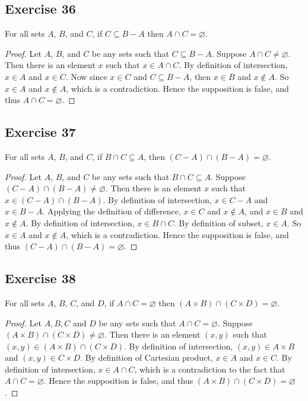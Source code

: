 \documentclass[14pt]{extarticle}
\newcommand{\es}{\varnothing}
\begin{document}
\subsection{Exercise 36}
For all sets $A$, $B$, and $C$, if \(C \subseteq B - A\) then \(A \cap C = \es\).

\begin{proof}
  Let $A$, $B$, and $C$ be any sets such that \(C \subseteq B - A\). Suppose \(A \cap C \neq \es\). Then there is an
  element $x$ such that \(x \in A \cap C\). By definition of intersection, \(x \in A\) and \(x \in C\). Now since \(x
  \in C\) and \(C \subseteq B - A\), then \(x \in B\) and \(x \notin A\). So \(x \in A\) and \(x \notin A\), which is a
  contradiction. Hence the supposition is false, and thus \(A \cap C = \es\).
\end{proof}

\subsection{Exercise 37}
For all sets $A$, $B$, and $C$, if \(B \cap C \subseteq A\), then \((C - A) \cap (B - A) = \es\).

\begin{proof}
  Let $A$, $B$, and $C$ be any sets such that \(B \cap C \subseteq A\). Suppose \((C-A) \cap (B-A) \neq \es\). Then
  there is an element $x$ such that \(x \in (C-A) \cap (B-A)\). By definition of intersection, \(x \in C-A\) and \(x
  \in B-A\). Applying the definition of difference, \(x \in C\) and \(x \notin A\), and \(x \in B\) and \(x \notin A\).
  By definition of intersection, \(x \in B \cap C\). By definition of subset, \(x \in A\). So \(x \in A\) and \(x
  \notin A\), which is a contradiction. Hence the supposition is false, and thus \((C-A) \cap (B-A) = \es\).
\end{proof}

\subsection{Exercise 38}
For all sets $A$, $B$, $C$, and $D$, if \(A \cap C = \es\) then \((A \times B) \cap (C \times D) = \es\).

\begin{proof}
  Let $A, B, C$ and $D$ be any sets such that \(A \cap C = \es\). Suppose \((A \times B) \cap (C \times D) \neq \es\).
  Then there is an element $(x, y)$ such that \((x,y) \in (A \times B) \cap (C \times D)\). By definition of
  intersection, \((x,y) \in A \times B\) and \((x,y) \in C \times D\). By definition of Cartesian product, \(x \in A\)
  and \(x \in C\). By definition of intersection, \(x \in A \cap C\), which is a contradiction to the fact that \(A
  \cap C = \es\). Hence the supposition is false, and thus \((A \times B) \cap (C \times D) = \es\).
\end{proof}
\end{document}
